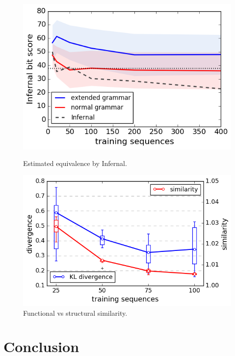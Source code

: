 \documentclass[a4paper]{esannV2}
\begin{document}
\begin{figure}[ht]
      \centering
  \begin{minipage}[b]{0.47\textwidth}
    \includegraphics[width=\textwidth]{images/infernal.png}
      \caption{\footnotesize{Estimated equivalence by Infernal.}}
      \label{infeval}
  \end{minipage}
  \hfill \begin{minipage}[b]{0.51\textwidth}
    \includegraphics[width=\textwidth]{images/learningcurve.png}
      \caption{\footnotesize{Functional vs structural similarity.}}
     \label{learncurve}
  \end{minipage}
\end{figure}

    
 
\section{Conclusion}
\end{document}
